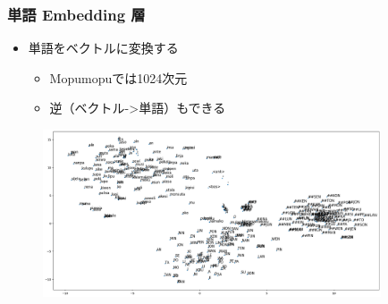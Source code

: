 \documentclass[14pt]{beamer}
\begin{document}
\begin{frame}
	\frametitle{単語 Embedding 層}

	\begin{itemize}
		\item 単語をベクトルに変換する
			\begin{itemize}
				\item Mopumopuでは1024次元
				\item 逆（ベクトル->単語）もできる
			\end{itemize}
	\end{itemize}

	\begin{figure}[H]
		\centering
		\includegraphics[width=10cm]{embed.png}
	\end{figure}
\end{frame}
\end{document}
